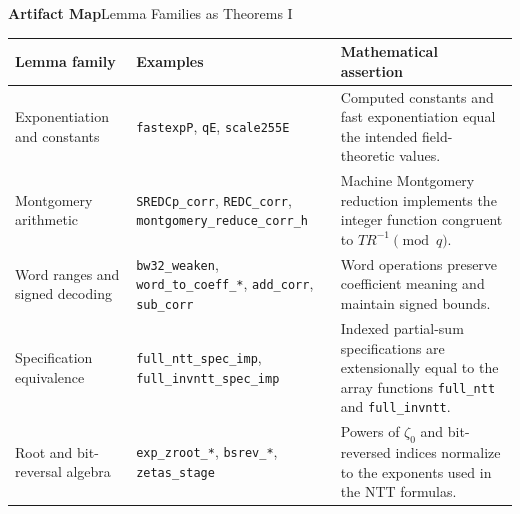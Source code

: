 \documentclass[10pt,aspectratio=1610,compress,dvipsnames]{beamer}
\newcommand{\ec}[1]{\texttt{#1}}
\begin{document}
\begin{frame}{\bfseries Artifact Map}{Lemma Families as Theorems I}
\begin{center}
\tiny\renewcommand{\arraystretch}{1.13}
\setlength{\tabcolsep}{3pt}
\begin{tabular}{p{3.0cm}p{3.7cm}p{5.3cm}}
\toprule[1.2pt]
\textbf{Lemma family} & \textbf{Examples} & \textbf{Mathematical assertion} \\
\midrule
Exponentiation and constants & \ec{fastexpP}, \ec{qE}, \ec{scale255E} &
Computed constants and fast exponentiation equal the intended field-theoretic
values. \\
Montgomery arithmetic & \ec{SREDCp\_corr}, \ec{REDC\_corr},
\ec{montgomery\_reduce\_corr\_h} & Machine Montgomery reduction implements the
integer function congruent to $T R^{-1}\pmod q$. \\
Word ranges and signed decoding & \ec{bw32\_weaken}, \ec{word\_to\_coeff\_*},
\ec{add\_corr}, \ec{sub\_corr} & Word operations preserve coefficient meaning
and maintain signed bounds. \\
Specification equivalence & \ec{full\_ntt\_spec\_imp},
\ec{full\_invntt\_spec\_imp} & Indexed partial-sum specifications are
extensionally equal to the array functions \ec{full\_ntt} and
\ec{full\_invntt}. \\
Root and bit-reversal algebra & \ec{exp\_zroot\_*}, \ec{bsrev\_*},
\ec{zetas\_stage} & Powers of $\zeta_0$ and bit-reversed indices normalize to
the exponents used in the NTT formulas. \\
\bottomrule[1.2pt]
\end{tabular}
\end{center}
\end{frame}
\end{document}
